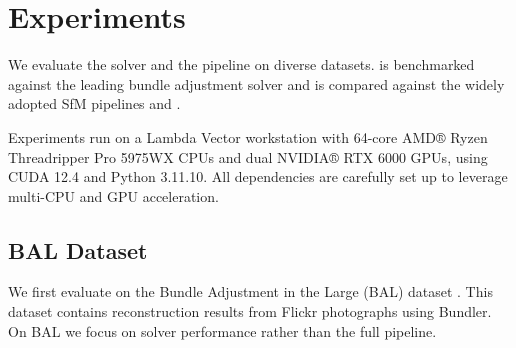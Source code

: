 
\section{Experiments}
\label{sec:exp}



We evaluate the \nameshort solver and the \xmsfm pipeline on diverse datasets. \nameshort is benchmarked against the leading bundle adjustment solver \ceres and \xmsfm is compared against the widely adopted SfM pipelines \colmap and \glomap.

Experiments run on a Lambda Vector workstation with 64-core AMD® Ryzen Threadripper Pro 5975WX CPUs and dual NVIDIA® RTX 6000 GPUs, using CUDA 12.4 and Python 3.11.10. All dependencies are carefully set up to leverage multi-CPU and GPU acceleration.






\subsection{BAL Dataset}\label{sec:exp-bal}

We first evaluate on the Bundle Adjustment in the Large (BAL) dataset \cite{agarwal2010bundle}. This dataset contains reconstruction results from Flickr photographs using Bundler. On BAL we focus on \nameshort  solver performance rather than the full \xmsfm pipeline. 

